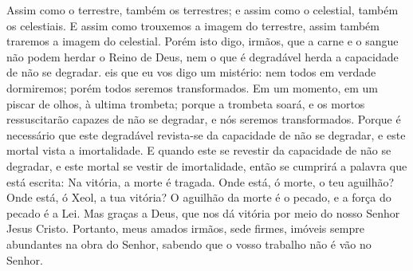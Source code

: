 {Assim como
{} o terrestre, também
{} os terrestres; e assim como
{} o celestial, também
{} os celestiais.
E assim como trouxemos a imagem do terrestre, assim também traremos a imagem do celestial.
Porém isto digo, irmãos, que a carne e o sangue não podem herdar o Reino de Deus, nem o que é degradável herda a capacidade de não se degradar.
eis que eu vos digo um mistério: nem todos em verdade dormiremos; porém todos seremos transformados.
Em um momento, em um piscar de olhos, à ultima trombeta; porque a trombeta soará, e os mortos ressuscitarão capazes de não se degradar, e nós seremos transformados.
Porque é necessário que este
{} degradável revista-se da capacidade de não se degradar, e este
{} mortal vista a imortalidade.
E quando este
{} se revestir da capacidade de não se degradar, e este
{} mortal se vestir de imortalidade, então se cumprirá a palavra que está escrita: Na vitória, a morte é tragada.
Onde está, ó morte, o teu aguilhão? Onde está, ó Xeol,
 a tua vitória?
O aguilhão da morte é o pecado, e a força do pecado é a Lei.
Mas graças a Deus, que nos dá vitória por meio do nosso Senhor Jesus Cristo.
Portanto, meus amados irmãos, sede firmes, imóveis
{} sempre abundantes na obra do Senhor, sabendo que o vosso trabalho não é vão no Senhor.

}
